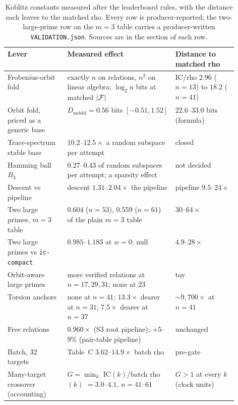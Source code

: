 \begin{table}[t]
\centering\small
\begin{tabularx}{\linewidth}{@{}>{\raggedright}p{0.26\linewidth}>{\raggedright}X>{\raggedright\arraybackslash}p{0.27\linewidth}@{}}
\toprule
Lever & Measured effect & Distance to matched rho \\
\midrule
Frobenius-orbit fold & exactly $n$ on relations, $n^2$ on linear algebra; $\log_2 n$ bits at matched $\lvert \mathcal{F} \rvert$ & IC/rho $2.96$ ($n=13$) to $18.2$ ($n=41$) \\
Orbit fold, priced as a generic base & $D_{\text{nofold}}=0.56$ bits $[-0.51,1.52]$ & $22.6$--$33.0$ bits (formula) \\
Trace-spectrum stable base & $10.2$--$12.5\times$ a random subspace per attempt & closed \\
Hamming ball $B_3$ & $0.27$--$0.43$ of random subspaces per attempt; a sparsity effect & not decided \\
Descent vs pipeline & descent $1.31$--$2.04\times$ the pipeline & pipeline $9.5$--$24\times$ \\
Two large primes, $m=3$ table & $0.604$ ($n=53$), $0.559$ ($n=61$) of the plain $m=3$ table & $30$--$64\times$ \\
Two large primes vs \texttt{ic-compact} & $0.985$--$1.183$ at $w=0$; null & $4.9$--$28\times$ \\
Orbit-aware large primes & more verified relations at $n=17,29,31$; none at $23$ & toy \\
Torsion anchors & none at $n=41$; $13.3\times$ dearer at $n=31$; $7.5\times$ dearer at $n=37$ & $\sim9{,}700\times$ at $n=41$ \\
Free relations & $0.960\times$ (S3 root pipeline); $+5$--$9\%$ (pair-table pipeline) & unchanged \\
Batch, 32 targets & Table~C $3.62$--$14.9\times$ batch rho & pre-gate \\
Many-target crossover (accounting) & $G=\min_k$ IC$(k)$/batch rho$(k)$ $=3.0$--$4.1$, $n=41$--$61$ & $G>1$ at every $k$ (clock units) \\
\bottomrule
\end{tabularx}
\caption[]{Koblitz constants measured after the leaderboard rules, with the
distance each leaves to the matched rho. Every row is producer-reported;
the two-large-prime row on the $m=3$ table carries a producer-written
\texttt{VALIDATION.json}. Sources are in the section of each row.}
\label{tab:kc-summary}
\end{table}

